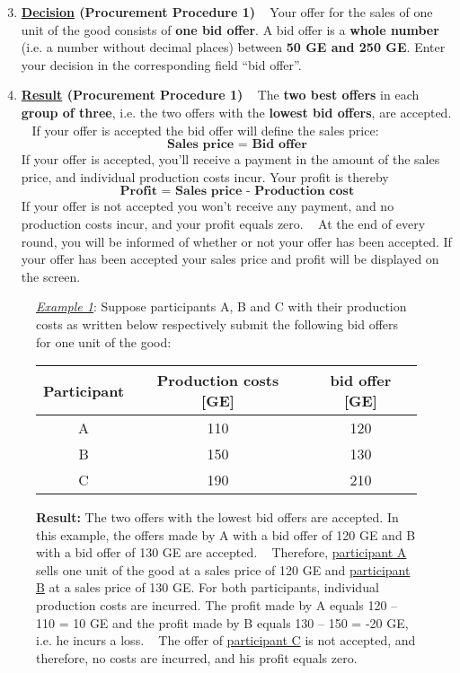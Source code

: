 \documentclass[11pt]{article}
\begin{document}
\begin{enumerate}[label=\textbf{\upshape(\arabic*\upshape)}] \setcounter{enumi}{2}
	\item \textbf{\underline{Decision} (Procurement Procedure 1)} ~\smallbreak
		Your offer for the sales of one unit of the good consists of \textbf{one bid offer}. A bid offer is a \textbf{whole number} (i.e. a number without decimal places) between \textbf{50 GE and 250 GE}. Enter your decision in the corresponding field \enquote{bid offer}.
	\item \textbf{\underline{Result} (Procurement Procedure 1)} ~\smallbreak
		The \textbf{two best offers} in each \textbf{group of three}, i.e. the two offers with the \textbf{lowest bid offers}, are accepted. ~\smallbreak
		If your offer is accepted the bid offer will define the sales price:
			$$ \textbf{Sales price = Bid offer} $$
		If your offer is accepted, you’ll receive a payment in the amount of the sales price, and individual production costs incur. Your profit is thereby
			$$ \textbf{Profit = Sales price - Production cost} $$
		If your offer is not accepted you won’t receive any payment, and no production costs incur, and your profit equals zero. ~\smallbreak
		At the end of every round, you will be informed of whether or not your offer has been accepted. If your offer has been accepted your sales price and profit will be displayed on the screen.
\end{enumerate}


\begin{figure}[h!] 
	\begin{minipage}[t]{1\linewidth} 
		\begin{tcolorbox}[colback=pink,arc=0pt,colframe=black!25]
			\underline{\textit{Example 1}}: Suppose participants A, B and C with their production costs as written below respectively submit the following bid offers for one unit of the good:
			\begin{center}
				\begin{tabular}{c|cc}
					Participant & Production costs [GE] & bid offer [GE] \\
					\hline
					A			& 110				 	& 120 	\\
					B			& 150	 				& 130   \\
					C			& 190					& 210
				\end{tabular} \bigbreak	
			\end{center}	
			\textbf{Result:} The two offers with the lowest bid offers are accepted. In this example, the offers made by A with a bid offer of 120 GE and B with a bid offer of 130 GE are accepted. ~\medbreak
			Therefore, \underline{participant A} sells one unit of the good at a sales price of 120 GE and \underline{participant B} at a sales price of 130 GE. For both participants, individual production costs are incurred. The profit made by A equals 120 – 110 = 10 GE and the profit made by B equals 130 – 150 = -20 GE, i.e. he incurs a loss. ~\medbreak
			The offer of \underline{participant C} is not accepted, and therefore, no costs are incurred, and his profit equals zero.      
		\end{tcolorbox} 
	\end{minipage}  
\end{figure}
\end{document}
